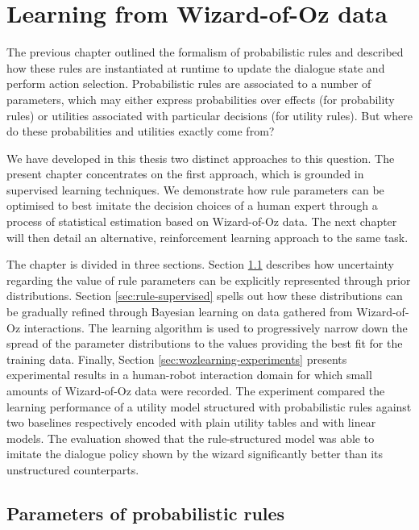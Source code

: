 
\chapter{Learning from Wizard-of-Oz data}
\label{chap:wozlearning}


The previous chapter outlined the formalism of probabilistic rules and described how these rules are instantiated at runtime to update the dialogue state and perform action selection. Probabilistic rules are associated to a number of parameters, which may either express probabilities over effects (for probability rules) or utilities associated with particular decisions (for utility rules). But where do these probabilities and utilities exactly come from?

We have developed in this thesis two distinct approaches to this question. The present chapter concentrates on the first approach, which is grounded in supervised learning techniques. We demonstrate how rule parameters can be optimised to best imitate the decision choices of a human expert through a process of statistical estimation based on Wizard-of-Oz data. The next chapter will then detail an alternative, reinforcement learning approach to the same task.

The chapter is divided in three sections.  Section \ref{sec:rule-params} describes how uncertainty regarding the value of rule parameters can be explicitly represented through prior distributions. Section \ref{sec:rule-supervised} spells out how these distributions can be gradually refined through Bayesian learning on data gathered from Wizard-of-Oz interactions.  The learning algorithm  is used to progressively narrow down the spread of the parameter distributions to the values providing the best fit for the training data. Finally, Section \ref{sec:wozlearning-experiments} presents experimental results in a human-robot interaction domain for which small amounts of Wizard-of-Oz data were recorded. The experiment compared the learning performance of a utility model structured with probabilistic rules against two baselines respectively encoded with plain utility tables and with linear models. The evaluation showed that the rule-structured model was able to imitate the dialogue policy shown by the wizard significantly better than its unstructured counterparts.

\section{Parameters of probabilistic rules}
\label{sec:rule-params}

